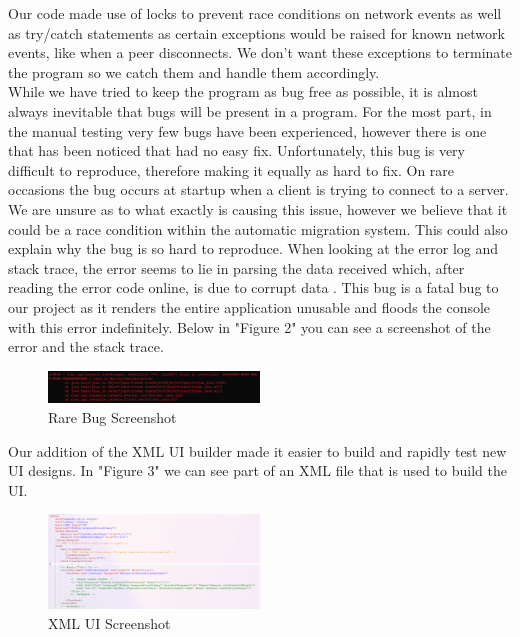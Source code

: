 \documentclass{COMPXXXX}
\begin{document}
\normalsize \textrm {Our code made use of locks to prevent race conditions on network events as well as try/catch statements as certain exceptions would be raised for known network events, like when a peer disconnects. We don't want these exceptions to terminate the program so we catch them and handle them accordingly.\\
While we have tried to keep the program as bug free as possible, it is almost always inevitable that bugs will be present in a program. For the most part, in the manual testing very few bugs have been experienced, however there is one that has been noticed that had no easy fix. Unfortunately, this bug is very difficult to reproduce, therefore making it equally as hard to fix. On rare occasions the bug occurs at startup when a client is trying to connect to a server. We are unsure as to what exactly is causing this issue, however we believe that it could be a race condition within the automatic migration system. This could also explain why the bug is so hard to reproduce. When looking at the error log and stack trace, the error seems to lie in parsing the data received which, after reading the error code online, is due to corrupt data \cite{streamcorruptedexception_invalid_type_code_ac}. This bug is a fatal bug to our project as it renders the entire application unusable and floods the console with this error indefinitely. Below in "Figure 2" you can see a screenshot of the error and the stack trace.}
\begin{figure}[h]
\centering
\includegraphics[width=0.5\textwidth]{rare_bug.png}
\caption{Rare Bug Screenshot}
\label{fig:figure2}
\end{figure}

\normalsize \textrm {Our addition of the XML UI builder made it easier to build and rapidly test new UI designs. In "Figure 3" we can see part of an XML file that is used to build the UI.}
\begin{figure}[h]
\centering
\includegraphics[width=0.5\textwidth]{xml_ui.png}
\caption{XML UI Screenshot}
\label{fig:figure3}
\end{figure}
\end{document}
